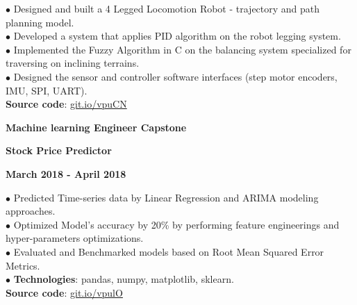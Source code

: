 \documentclass[10pt]{article}
\begin{document}
        \vspace{-5mm}

        $\bullet$ {Designed and built a 4 Legged Locomotion Robot - trajectory and path planning model.}\\
        $\bullet$ {Developed a system that applies PID algorithm on the robot legging system.}\\
        $\bullet$ {Implemented the Fuzzy Algorithm in C on the balancing system specialized for traversing on inclining terrains.} \\
        $\bullet$ {Designed the sensor and controller software interfaces (step motor encoders, IMU, SPI, UART).} \\
        \textbf{Source code}: \href{https://git.io/vpuCN}{git.io/vpuCN}



        \begin{multicols}{3}
            \begin{flushleft}
                \textbf{Machine learning Engineer Capstone}
            \end{flushleft}

            \columnbreak

            \begin{center}
                \textbf{Stock Price Predictor}
            \end{center}

            \columnbreak

            \begin{flushright}
                \textbf{March 2018 - April 2018}
            \end{flushright}
        \end{multicols}

        \vspace{-5mm}

        $\bullet$ {Predicted Time-series data by Linear Regression and ARIMA modeling approaches.} \\
        $\bullet$ {Optimized Model's accuracy by 20\% by performing feature engineerings and hyper-parameters optimizations.} \\
        $\bullet$ {Evaluated and Benchmarked models based on Root Mean Squared Error Metrics.} \\
        $\bullet$ {\textbf{Technologies}: pandas, numpy, matplotlib, sklearn.} \\
        \textbf{Source code}: \href{https://git.io/vpulO}{git.io/vpulO}
\end{document}
